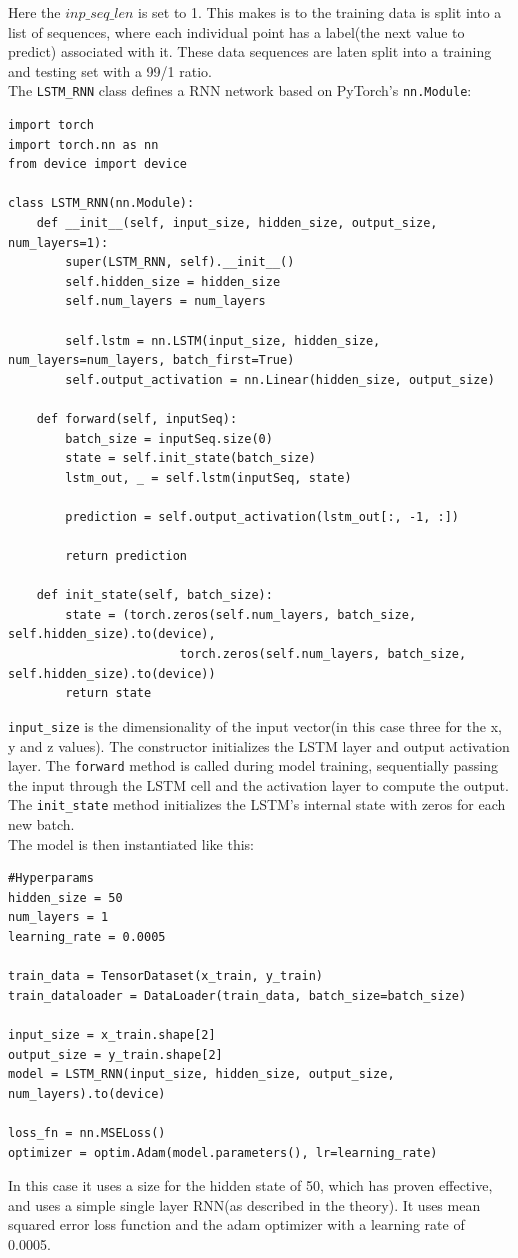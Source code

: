 \documentclass[11pt]{article}
\begin{document}
Here the $inp\_seq\_len$ is set to 1. This makes is to the training data is split into a list of sequences, where each individual point has a label(the next value to predict) associated with it. These data sequences are laten split into a training and testing set with a 99/1 ratio. \\

The \texttt{LSTM\_RNN} class defines a RNN network based on PyTorch's \texttt{nn.Module}:

\begin{lstlisting}
import torch
import torch.nn as nn
from device import device

class LSTM_RNN(nn.Module):
    def __init__(self, input_size, hidden_size, output_size, num_layers=1):
        super(LSTM_RNN, self).__init__()
        self.hidden_size = hidden_size
        self.num_layers = num_layers

        self.lstm = nn.LSTM(input_size, hidden_size, num_layers=num_layers, batch_first=True)
        self.output_activation = nn.Linear(hidden_size, output_size)
    
    def forward(self, inputSeq):
        batch_size = inputSeq.size(0)
        state = self.init_state(batch_size)
        lstm_out, _ = self.lstm(inputSeq, state)

        prediction = self.output_activation(lstm_out[:, -1, :])

        return prediction

    def init_state(self, batch_size):
        state = (torch.zeros(self.num_layers, batch_size, self.hidden_size).to(device),
                        torch.zeros(self.num_layers, batch_size, self.hidden_size).to(device))
        return state
\end{lstlisting}

\texttt{input\_size} is the dimensionality of the input vector(in this case three for the x, y and z values). The constructor initializes the LSTM layer and output activation layer. The \texttt{forward} method is called during model training, sequentially passing the input through the LSTM cell and the activation layer to compute the output. The \texttt{init\_state} method initializes the LSTM's internal state with zeros for each new batch. \\

The model is then instantiated like this:
\begin{lstlisting}
#Hyperparams
hidden_size = 50  
num_layers = 1  
learning_rate = 0.0005

train_data = TensorDataset(x_train, y_train)
train_dataloader = DataLoader(train_data, batch_size=batch_size)

input_size = x_train.shape[2]  
output_size = y_train.shape[2] 
model = LSTM_RNN(input_size, hidden_size, output_size, num_layers).to(device)

loss_fn = nn.MSELoss()
optimizer = optim.Adam(model.parameters(), lr=learning_rate)
\end{lstlisting}

In this case it uses a size for the hidden state of 50, which has proven effective, and uses a simple single layer RNN(as described in the theory). It uses mean squared error loss function and the adam optimizer with a learning rate of 0.0005. 
\end{document}
